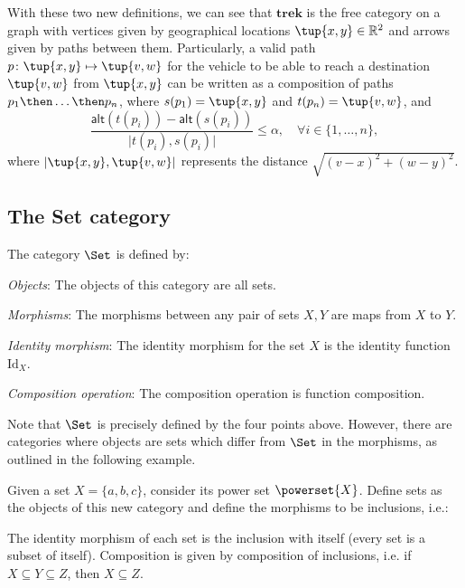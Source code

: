 With these two new definitions, we can see that $\mathbf{trek}$ is the free category on a graph with vertices given by geographical locations $\tup{x,y}\in \mathbb{R}^2$ and arrows given by paths between them. Particularly, a valid path $p\colon \tup{x,y}\mapsto \tup{v,w}$ for the vehicle to be able to reach a destination $\tup{v,w}$ from $\tup{x,y}$ can be written as a composition of paths $p_1\then \ldots \then p_n$, where $s(p_1)=\tup{x,y}$ and $t(p_n)=\tup{v,w}$, and
\begin{equation}
    \frac{\mathsf{alt}(t(p_i))-\mathsf{alt}(s(p_i))}{\vert t(p_i), s(p_i)\vert}\leq \alpha, \quad \forall i\in \{1,\ldots, n\},
\end{equation}
where $\vert \tup{x,y},\tup{v,w}\vert$ represents the distance $\sqrt{(v-x)^2+(w-y)^2}$.



\subsection{The Set category}


\begin{shaded}
\begin{definition}
    The category $\Set$ is defined by:
    \begin{compactenum}
    \item \emph{Objects}: The objects of this category are all sets.
    \item \emph{Morphisms}: The morphisms between any pair of sets $X, Y$
    are maps from $X$ to $Y$.
    \item \emph{Identity morphism}: The identity morphism for the set $X$
    is the identity function $\text{Id}_X$.
    \item \emph{Composition operation}: The composition operation is function
    composition.
    \end{compactenum}
\end{definition}
\end{shaded}

Note that $\Set$ is precisely defined by the four points above. However, there are categories where objects are sets which differ from $\Set$ in the morphisms, as outlined in the following example.
\begin{example}
\label{ex:hasseinclusion}
Given a set $X=\{a,b,c\}$, consider its power set $\powerset{X}$. Define sets as the objects of this new category and define the morphisms to be inclusions, i.e.:
\begin{center}
\end{center}
The identity morphism of each set is the inclusion with itself (every set is a subset of itself). Composition is given by composition of inclusions, i.e. if $X\subseteq Y \subseteq Z$, then $X\subseteq Z$.
\end{example}